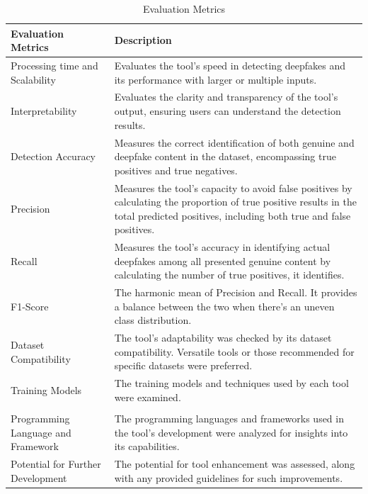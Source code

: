 \begin{table}[htpb]
	\caption{Evaluation Metrics}\label{tab:evaluation_metrics}
	\centering
	\small
	\begin{tabularx}{\textwidth}{l X}
		\toprule
		\textbf{Evaluation Metrics}         & \textbf{Description}                              \\
		\midrule
		Processing time and Scalability     & Evaluates the tool's speed in detecting deepfakes
		and its performance with larger or multiple inputs.                                     \\
		\addlinespace
		Interpretability                    & Evaluates the clarity and transparency of the
		tool's output, ensuring users can understand the detection results.                     \\
		\addlinespace
		Detection Accuracy                  & Measures the correct identification of both
		genuine and deepfake content in the dataset, encompassing true positives and true
		negatives.                                                                              \\
		\addlinespace
		Precision                           & Measures the tool's capacity to avoid false
		positives by calculating the proportion of true positive results in the total
		predicted positives, including both true and false positives.                           \\
		\addlinespace
		Recall                              & Measures the tool's accuracy in identifying
		actual deepfakes among all presented genuine content by calculating the number
		of true positives, it identifies.                                                        \\
		\addlinespace
		F1-Score                            & The harmonic mean of Precision and Recall.
		It provides a balance between the two when there's an uneven class distribution.        \\
		\addlinespace
		Dataset Compatibility               & The tool's adaptability was checked by its
		dataset compatibility. Versatile tools or those recommended for specific datasets
		were preferred.                                                                         \\
		\addlinespace
		Training Models                     & The training models and techniques used by
		each tool were examined.                                                                \\                                             \\
		\addlinespace
		Programming Language and Framework  & The programming languages and frameworks used
		in the tool's development were analyzed for insights into its capabilities.             \\
		\addlinespace
		Potential for Further Development & The potential for tool enhancement was assessed,
		along with any provided guidelines for such improvements.                               \\
		\bottomrule
	\end{tabularx}
\end{table}

